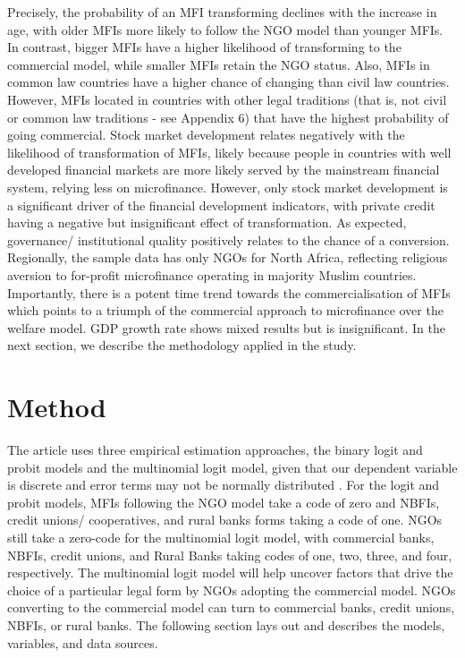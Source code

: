 \documentclass[a4paper, nobind]{templates/ociamthesis}
\begin{document}
Precisely, the probability of an MFI transforming declines with the increase in age, with older MFIs more likely to follow the NGO model than younger MFIs. In contrast, bigger MFIs have a higher likelihood of transforming to the commercial model, while smaller MFIs retain the NGO status. Also, MFIs in common law countries have a higher chance of changing than civil law countries. However, MFIs located in countries with other legal traditions (that is, not civil or common law traditions - see Appendix 6) that have the highest probability of going commercial. Stock market development relates negatively with the likelihood of transformation of MFIs, likely because people in countries with well developed financial markets are more likely served by the mainstream financial system, relying less on microfinance. However, only stock market development is a significant driver of the financial development indicators, with private credit having a negative but insignificant effect of transformation. As expected, governance/ institutional quality positively relates to the chance of a conversion. Regionally, the sample data has only NGOs for North Africa, reflecting religious aversion to for-profit microfinance operating in majority Muslim countries. Importantly, there is a potent time trend towards the commercialisation of MFIs which points to a triumph of the commercial approach to microfinance over the welfare model. GDP growth rate shows mixed results but is insignificant. In the next section, we describe the methodology applied in the study.

\hypertarget{method}{%
\section{Method}\label{method}}

The article uses three empirical estimation approaches, the binary logit and probit models and the multinomial logit model, given that our dependent variable is discrete and error terms may not be normally distributed \autocite{cramer2002origins}. For the logit and probit models, MFIs following the NGO model take a code of zero and NBFIs, credit unions/ cooperatives, and rural banks forms taking a code of one. NGOs still take a zero-code for the multinomial logit model, with commercial banks, NBFIs, credit unions, and Rural Banks taking codes of one, two, three, and four, respectively. The multinomial logit model will help uncover factors that drive the choice of a particular legal form by NGOs adopting the commercial model. NGOs converting to the commercial model can turn to commercial banks, credit unions, NBFIs, or rural banks. The following section lays out and describes the models, variables, and data sources.
\end{document}
